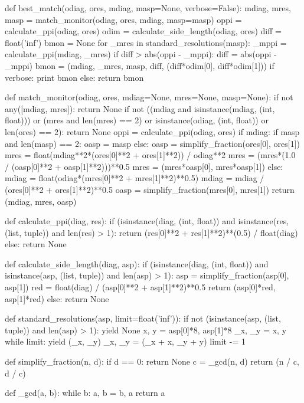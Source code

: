 \documentclass[12pt,letterpaper]{amsart}
\begin{document}
  \begin{python}
def best_match(odiag, ores, mdiag, masp=None, verbose=False):
    mdiag, mres, masp = match_monitor(odiag, ores, mdiag, masp=masp)
    oppi = calculate_ppi(odiag, ores)
    odim = calculate_side_length(odiag, ores)
    diff = float('inf')
    bmon = None
    for _mres in standard_resolutions(masp):
        _mppi = calculate_ppi(mdiag, _mres)
        if diff > abs(oppi - _mppi):
            diff = abs(oppi - _mppi)
            bmon = (mdiag, _mres, masp, diff, (diff*odim[0], diff*odim[1]))
            if verbose:
                print bmon
        else:
            return bmon

def match_monitor(odiag, ores, mdiag=None, mres=None, masp=None):
    if not any([mdiag, mres]):
        return None
    if not ((mdiag and isinstance(mdiag, (int, float)))
             or (mres and len(mres) == 2)
             or isinstance(odiag, (int, float))
             or len(ores) == 2):
        return None
    oppi = calculate_ppi(odiag, ores)
    if mdiag:
        if masp and len(masp) == 2:
            oasp = masp
        else:
            oasp = simplify_fraction(ores[0], ores[1])
        mres = float(mdiag**2*(ores[0]**2 + ores[1]**2)) / odiag**2
        mres = (mres*(1.0 / (oasp[0]**2 + oasp[1]**2)))**0.5
        mres = (mres*oasp[0], mres*oasp[1])
    else:
        mdiag = float(odiag*(mres[0]**2 + mres[1]**2)**0.5)
        mdiag = mdiag / (ores[0]**2 + ores[1]**2)**0.5
        oasp = simplify_fraction(mres[0], mres[1])
    return (mdiag, mres, oasp)

def calculate_ppi(diag, res):
    if (isinstance(diag, (int, float))
        and isinstance(res, (list, tuple))
        and len(res) > 1):
        return (res[0]**2 + res[1]**2)**(0.5) / float(diag)
    else:
        return None



def calculate_side_length(diag, asp):
    if (isinstance(diag, (int, float))
        and isinstance(asp, (list, tuple))
        and len(asp) > 1):
        asp = simplify_fraction(asp[0], asp[1])
        red = float(diag) / (asp[0]**2 + asp[1]**2)**0.5
        return (asp[0]*red, asp[1]*red)
    else:
        return None

def standard_resolutions(asp, limit=float('inf')):
    if not (isinstance(asp, (list, tuple))
            and len(asp) > 1):
        yield None
    x, y = asp[0]*8, asp[1]*8
    _x, _y = x, y
    while limit:
        yield (_x, _y)
        _x, _y = (_x + x, _y + y)
        limit -= 1

def simplify_fraction(n, d):
    if d == 0:
        return None
    c = _gcd(n, d)
    return (n / c, d / c)

def _gcd(a, b):
    while b:
        a, b = b, a %
    return a
  \end{python}
\end{document}
